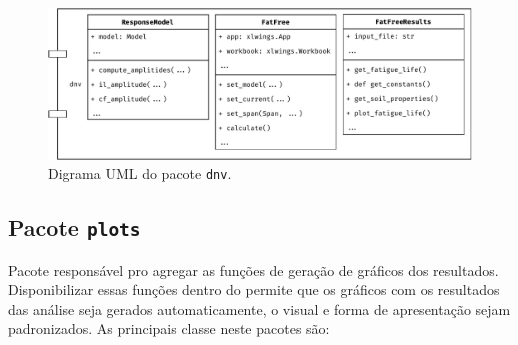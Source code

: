 \begin{figure}[!ht]
    \centering
    \caption{Digrama UML do pacote \texttt{dnv}.}\label{fig:dnv-uml}
    \includegraphics[width=\textwidth]{imagens/dnv-uml}
\end{figure}


\subsection{Pacote \texttt{plots}}


Pacote responsável pro agregar as funções de geração de gráficos dos resultados. Disponibilizar essas funções dentro do \frame permite que os gráficos com os resultados das análise seja gerados automaticamente, o visual e forma de apresentação sejam padronizados. As principais classe neste pacotes são:

